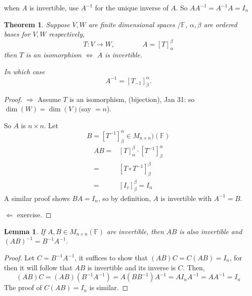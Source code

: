 \documentclass[12pt]{article}
\newtheorem{theorem}{Theorem}[subsection]
\newtheorem{lemma}{Lemma}[subsection]
\newcommand{\mF}{{\mathbb{F}}}
\begin{document}
	when $A$ is invertible, use $A^{-1}$ for the unique inverse of $A$. So 
	$AA^{-1} = A^{-1}A = I_n$

	\begin{theorem}
		Suppose $V, W$ are finite dimensional spaces $/\mF$, $\alpha, \beta$
		are ordered bases for $V, W$ respectively, 
		\[
			T:V\to W, \qquad \qquad A = [T]_{\alpha}^{\beta}
		\]
		then $T$ is an isomorphism $\iff$ $A$ is invertible. 

		In which case
		\[
			A^{-1} = [T_{-1}]_{\beta}^{\alpha}. 
		\]
	\end{theorem}
	\begin{proof}
		$\Rightarrow$ Assume $T$ is an isomorphism, (bijection), 
		Jan 31: so $\dim (W) = \dim(V)($say $= n$). 

		So $A$ is $n\times n$.
		Let 
		\[
			B = [T^{-1}]_{\beta}^{\alpha} \in M_{n\times n})(\mF)
		\]
		\begin{align*}
			AB =& [T]_{\alpha}^{\beta}\cdot [T^{-1}]_{\beta}^{\alpha}\\
			=& [T\circ T^{-1}]_{\beta}^{\beta} \tag{By Monday's Theorem}\\
			=& [I_v]_{\beta}^{\beta} 
			=I_n
		\end{align*}
		A similar proof shows $BA = I_n$, so by definition, $A$ is invertible
		with $A^{-1} = B$. 

		$\Leftarrow$ exercise. 
	\end{proof}

	\begin{lemma}
		If $A,B \in M_{n\times n}(\mF)$ are invertible, then $AB$ is also 
		invertible and $(AB)^{-1} = B^{-1}A^{-1}$.  
	\end{lemma}
	\begin{proof}
		Let $C = B^{-1}A^{-1}$, it suffices to show that $(AB)C = C(AB) = I_n$,
		for then it will follow that $AB$ is invertible and its inverse is $C$.
		Then, 
		\[
			(AB)C = (AB)(B^{-1}A^{-1}) = A(BB^{-1})A^{-1} = AI_nA^{-1} = AA^{-1}
			=I_n
		\]
		The proof of $C(AB)=I_n$ is similar. 
	\end{proof}




\end{document}
